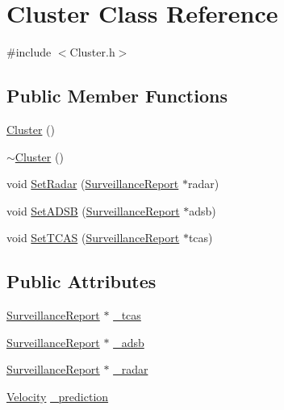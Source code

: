 \hypertarget{class_cluster}{}\section{Cluster Class Reference}
\label{class_cluster}


{\ttfamily \#include $<$Cluster.\+h$>$}

\subsection*{Public Member Functions}
\begin{DoxyCompactItemize}
\item 
\hyperlink{class_cluster_aee7feb1d599d4c8fda6c3ee83e86ba81}{Cluster} ()
\item 
\hyperlink{class_cluster_a4bddfc88ac859610acab15dd12851b58}{$\sim$\+Cluster} ()
\item 
void \hyperlink{class_cluster_ac9744c81bd16818163fac86dc7b763f9}{Set\+Radar} (\hyperlink{class_surveillance_report}{Surveillance\+Report} $\ast$radar)
\item 
void \hyperlink{class_cluster_ad2b6a9ddb1638222f6626a02373de95a}{Set\+A\+D\+S\+B} (\hyperlink{class_surveillance_report}{Surveillance\+Report} $\ast$adsb)
\item 
void \hyperlink{class_cluster_afb736b19fe7cabe0f188d749d301cd66}{Set\+T\+C\+A\+S} (\hyperlink{class_surveillance_report}{Surveillance\+Report} $\ast$tcas)
\end{DoxyCompactItemize}
\subsection*{Public Attributes}
\begin{DoxyCompactItemize}
\item 
\hyperlink{class_surveillance_report}{Surveillance\+Report} $\ast$ \hyperlink{class_cluster_a1f0fe867c014f712107f0e9520e24fd6}{\+\_\+tcas}
\item 
\hyperlink{class_surveillance_report}{Surveillance\+Report} $\ast$ \hyperlink{class_cluster_ac355d268de451a7a5fe380e86fc1d0d9}{\+\_\+adsb}
\item 
\hyperlink{class_surveillance_report}{Surveillance\+Report} $\ast$ \hyperlink{class_cluster_a0a84e94aa8852d266191b0b42f09a335}{\+\_\+radar}
\item 
\hyperlink{class_velocity}{Velocity} \hyperlink{class_cluster_a7c4db5664d0b443e2957241c774f9eec}{\+\_\+prediction}
\end{DoxyCompactItemize}


